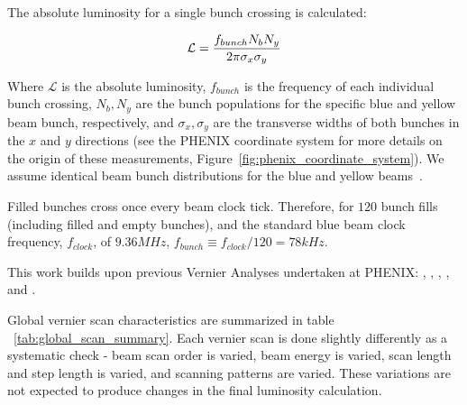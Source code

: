 {\noindent}The absolute luminosity for a single bunch crossing is calculated:

\begin{equation} 
\label{eq:lumi_one_bunch} 
\mathcal{L} = {f_{bunch}N_{b} N_{y}\over{2\pi\sigma_{x}\sigma_{y}}} 
\end{equation}

Where $\mathcal{L}$ is the absolute luminosity, $f_{bunch}$ is the frequency of
each individual bunch crossing, $N_{b}, N_{y}$ are the bunch populations for the
specific blue and yellow beam bunch, respectively, and $\sigma_{x}, \sigma_{y}$
are the transverse widths of both bunches in the $x$ and $y$ directions (see the
PHENIX coordinate system for more details on the origin of these measurements, Figure~\ref{fig:phenix_coordinate_system}). We assume identical beam bunch
distributions for the blue and yellow beams~\cite{AN888Datta2010}.

Filled bunches cross once every beam clock tick. Therefore, for $120$ bunch
fills (including filled and empty bunches), and the standard blue beam clock
frequency, $f_{clock}$, of $9.36 MHz$, $f_{bunch} \equiv f_{clock} / 120 = 78
kHz$.

This work builds upon previous Vernier Analyses undertaken at PHENIX:
\cite{AN184Belikov2003}, \cite{an597Bazilevsky2007}, \cite{an688Bennett2008},
\cite{AN888Datta2010}, and \cite{Drees2009}.

Global vernier scan characteristics are summarized in table
~\ref{tab:global_scan_summary}. Each vernier scan is done slightly differently
as a systematic check - beam scan order is varied, beam energy is varied, scan
length and step length is varied, and scanning patterns are varied. These
variations are not expected to produce changes in the final luminosity
calculation.

